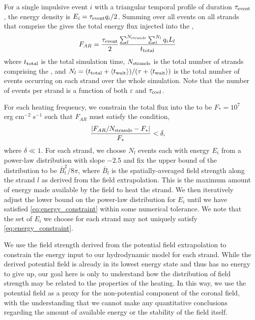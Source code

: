 For a single impulsive event $i$ with a triangular temporal profile of duration $\tau_{\textup{event}}$, the energy density is $E_i=\tau_{\textup{event}}q_i/2$. Summing over all events on all strands that comprise the \AR{} gives the total energy flux injected into the \AR{},
\begin{equation}
    F_{AR} = \frac{\tau_{\textup{event}}}{2}\frac{\sum_l^{N_{\textup{strands}}}\sum_i^{N_l} q_iL_l}{t_\textup{total}}
\end{equation}
where $t_\textup{total}$ is the total simulation time, $N_\textup{strands}$ is the total number of strands comprising the \AR{}, and $N_l=(t_\textup{total} + \langle t_{\textup{wait}}\rangle)/(\tau + \langle t_{\textup{wait}}\rangle)$ is the total number of events occurring on each strand over the whole simulation. Note that the number of events per strand is a function of both $\varepsilon$ and $\tau_{\textup{cool}}$.

For each heating frequency, we constrain the total flux into the \AR{} to be $F_{\ast}=10^7$ erg cm$^{-2}$ s$^{-1}$ \citep{withbroe_mass_1977} such that $F_{AR}$ must satisfy the condition,
\begin{equation}\label{eq:energy_constraint}
    \frac{| F_{AR}/N_\textup{strands} - F_{\ast} |}{F_{\ast}} < \delta,
\end{equation}
where $\delta\ll1$. For each strand, we choose $N_l$ events each with energy $E_i$ from a power-law distribution with slope $-2.5$ and fix the upper bound of the distribution to be $\bar{B}_l^2/8\pi$, where $\bar{B}_l$ is the spatially-averaged field strength along the strand $l$ as derived from the field extrapolation. This is the maximum amount of energy made available by the field to heat the strand. We then iteratively adjust the lower bound on the power-law distribution for $E_i$ until we have satisfied \autoref{eq:energy_constraint} within some numerical tolerance. We note that the set of $E_i$ we choose for each strand may not uniquely satisfy \autoref{eq:energy_constraint}.

We use the field strength derived from the potential field extrapolation to constrain the energy input to our hydrodynamic model for each strand. While the derived potential field is already in its lowest energy state and thus has no energy to give up, our goal here is only to understand how the distribution of field strength may be related to the properties of the heating. In this way, we use the potential field as a proxy for the non-potential component of the coronal field, with the understanding that we cannot make any quantitative conclusions regarding the amount of available energy or the stability of the field itself.

